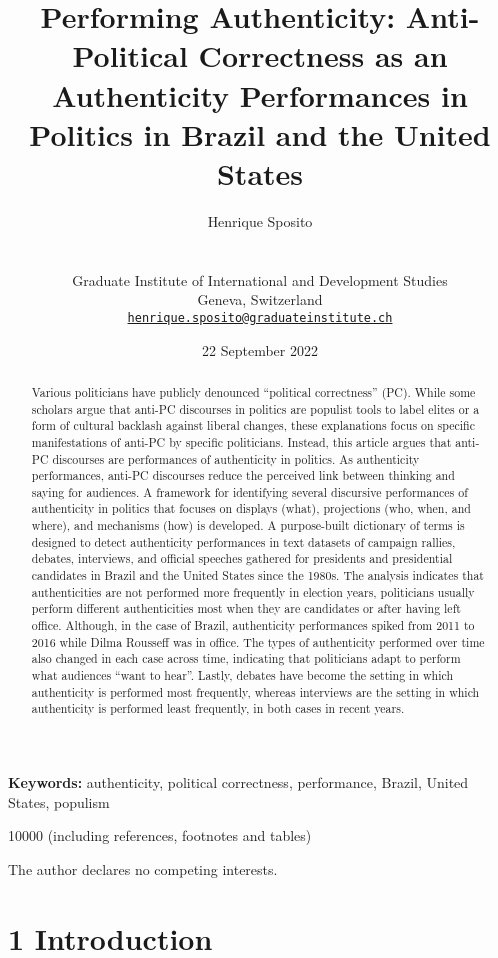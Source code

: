 \documentclass[
  12pt,
]{article}
\title{Performing Authenticity: Anti-Political Correctness as an
Authenticity Performances in Politics in Brazil and the United States}
\author{Henrique Sposito\\
\strut \\
Graduate Institute of International and Development Studies\\
Geneva, Switzerland\\
\href{mailto:henrique.sposito@graduateinstitute.ch}{\nolinkurl{henrique.sposito@graduateinstitute.ch}}}
\date{22 September 2022}
\providecommand{\keywords}[1]{\textbf{Keywords:} #1}
\providecommand{\wordcount}[1]{\text{Word Count:} #1}
\providecommand{\declaration}[1]{\text{}#1}
\begin{document}
\maketitle
\begin{abstract}
Various politicians have publicly denounced ``political correctness''
(PC). While some scholars argue that anti-PC discourses in politics are
populist tools to label elites or a form of cultural backlash against
liberal changes, these explanations focus on specific manifestations of
anti-PC by specific politicians. Instead, this article argues that
anti-PC discourses are performances of authenticity in politics. As
authenticity performances, anti-PC discourses reduce the perceived link
between thinking and saying for audiences. A framework for identifying
several discursive performances of authenticity in politics that focuses
on displays (what), projections (who, when, and where), and mechanisms
(how) is developed. A purpose-built dictionary of terms is designed to
detect authenticity performances in text datasets of campaign rallies,
debates, interviews, and official speeches gathered for presidents and
presidential candidates in Brazil and the United States since the 1980s.
The analysis indicates that authenticities are not performed more
frequently in election years, politicians usually perform different
authenticities most when they are candidates or after having left
office. Although, in the case of Brazil, authenticity performances
spiked from 2011 to 2016 while Dilma Rousseff was in office. The types
of authenticity performed over time also changed in each case across
time, indicating that politicians adapt to perform what audiences ``want
to hear''. Lastly, debates have become the setting in which authenticity
is performed most frequently, whereas interviews are the setting in
which authenticity is performed least frequently, in both cases in
recent years.
\end{abstract}

\keywords{authenticity, political correctness, performance, Brazil, United States, populism}

\wordcount{10000 (including references, footnotes and tables)}

\declaration{The author declares no competing interests.}

\hypertarget{introduction}{%
\section{1 Introduction}\label{introduction}}
\end{document}
